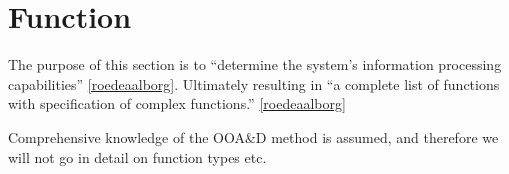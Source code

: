 \section{Function}
The purpose of this section is to ``determine the system's information processing capabilities'' \ref{roedeaalborg}. Ultimately resulting in ``a complete list of functions with specification of complex functions.'' 
\ref{roedeaalborg}

Comprehensive knowledge of the OOA\&D method is assumed, and therefore we will not go in detail on function types etc. 

\begin{table}[h] %


\end{table}
